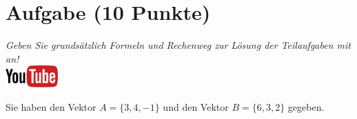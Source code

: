 \documentclass[a4paper, 10pt]{scrartcl}\usepackage[]{graphicx}\usepackage[]{xcolor}
\begin{document}
\clearpage\null


  
\clearpage

\section{Aufgabe \hfill (10 Punkte)}

\textit{Geben Sie grunds{\"a}tzlich Formeln und Rechenweg zur L{\"o}sung der
  Teilaufgaben mit an!} \\[1Ex]

\hfill\href{https://youtu.be/x_MwWJoEsME}{\includegraphics[width =
  2cm]{img/youtube}} %
\hspace{2Ex}



Sie haben den Vektor $A = \{3, 4, -1\}$ und den Vektor $B = \{6, 3, 2\}$ gegeben.
\end{document}
